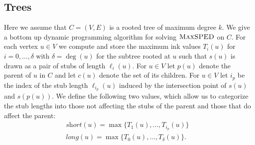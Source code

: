 \documentclass[a4paper,english,numberwithinsect]{eurocg18}
\newcommand{\maxsped}{\ensuremath{\textsc{MaxSPED}}\xspace}
\newcommand{\sollong}{\ensuremath{\textit{long}}\xspace}
\newcommand{\solshort}{\ensuremath{\textit{short}}\xspace}
\begin{document}
\subsection{Trees}
\label{sec:tree}


Here we assume that $ C =(V,E) $ is a rooted tree of maximum degree $ k $. 
We give a bottom up dynamic programming algorithm for solving \maxsped on $ C $. 
For each vertex $u \in V$ we compute and store the maximum ink values $T_i(u)$ for $i = 0, \dots, \delta$ with $\delta = \deg(u)$ for the subtree rooted at $u$ such that $s(u)$ is drawn as a pair of stubs of length $\ell_i(u)$.
For $ u \in V $ let $ p(u) $ denote the parent of $ u $ in $ C $ and let $ c(u) $ denote the set of its children. 
For $ u \in V $  %
let $ i_p $ be the index of the stub length $\ell_{i_p}(u)$ induced by the intersection point of $s(u)$ and $s(p(u))$.
We define the following two values, which allow us to categorize the stub lengths into those not affecting the stubs of the parent and those that do affect the parent:
\begin{align*}
	\solshort(u) = \max\{T_1(u),\dots,T_{i_p}(u)\}\\ %
	\sollong(u) = \max\{T_0(u),\dots,T_{\delta}(u)\}.
\end{align*}
\end{document}
